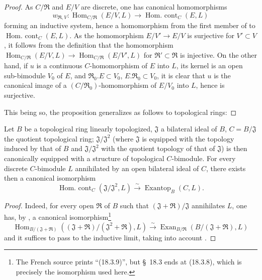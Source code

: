 \begin{proof}
As $C/\mathfrak{R}$ and $E/V$ are discrete, one has canonical homomorphisms
\[
  w_{\mathfrak{R},V}:\operatorname{Hom}_{C/\mathfrak{R}}(E/V,L)
  \longrightarrow\operatorname{Hom.\ cont}_C(E,L)
\]
forming an inductive system, hence a homomorphism from the first member of  to $\operatorname{Hom.\ cont}_C(E,L)$.
As the homomorphism $E/V'\to E/V$ is surjective for $V'\subset V$, it follows from the definition that the homomorphism $\operatorname{Hom}_{C/\mathfrak{R}}(E/V,L)\to\operatorname{Hom}_{C/\mathfrak{R}}(E/V',L)$ for $\mathfrak{R}'\subset\mathfrak{R}$ is injective.
On the other hand, if $u$ is a continuous $C$-homomorphism of $E$ into $L$, its kernel is an open sub-bimodule $V_0$ of $E$, and $\mathfrak{R}_0.E\subset V_0$, $E.\mathfrak{R}_0\subset V_0$, it is clear that $u$ is the canonical image of a $(C/\mathfrak{R}_0)$-homomorphism of $E/V_0$ into $L$, hence  is surjective.

This being so, the proposition  generalizes as follows to topological rings:
\end{proof}

\begin{proposition}[18.5.4]
\label{0.18.5.4}
Let $B$ be a topological ring linearly topologized, $\mathfrak{J}$ a bilateral ideal of $B$, $C=B/\mathfrak{J}$ the quotient topological ring; $\mathfrak{J}/\mathfrak{J}^2$ \textup{(}where $\mathfrak{J}$ is equipped with the topology induced by that of $B$ and $\mathfrak{J}/\mathfrak{J}^2$ with the quotient topology of that of $\mathfrak{J}$\textup{)} is then canonically equipped with a structure of topological $C$-bimodule.
For every discrete $C$-bimodule $L$ annihilated by an open bilateral ideal of $C$, there exists then a canonical isomorphism
\begin{equation}
\tag{18.5.4.1}
  \label{0.18.5.4.1}
  \operatorname{Hom.\ cont}_C(\mathfrak{J}/\mathfrak{J}^2,L)\xrightarrow{\sim}\operatorname{Exantop}_B(C,L).
\end{equation}
\end{proposition}

\begin{proof}
Indeed, for every open $\mathfrak{R}$ of $B$ such that $(\mathfrak{J}+\mathfrak{R})/\mathfrak{J}$ annihilates $L$, one has, by , a canonical isomorphism\footnote{The French source prints ``(18.3.9)'', but \S~18.3 ends at (18.3.8), which is precisely the isomorphism used here.}
\[
  \operatorname{Hom}_{B/(\mathfrak{J}+\mathfrak{R})}((\mathfrak{J}+\mathfrak{R})/(\mathfrak{J}^2+\mathfrak{R}),L)\xrightarrow{\sim}\operatorname{Exan}_{B/\mathfrak{R}}(B/(\mathfrak{J}+\mathfrak{R}),L)
\]
and it suffices to pass to the inductive limit, taking into account .
\end{proof}
